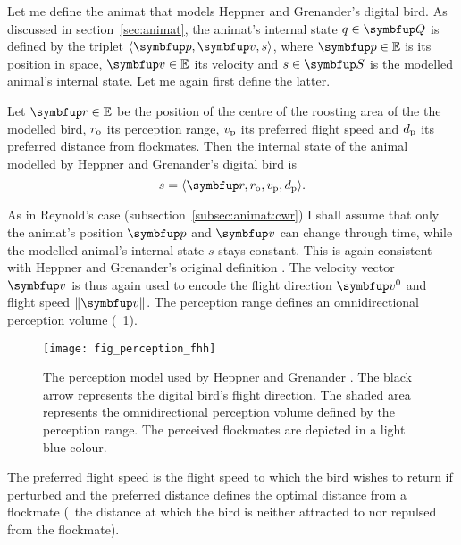Let me define the animat that models Heppner and Grenander's digital bird. As discussed in section~\ref{sec:animat}, the animat's internal state $q \in \set{Q}$ is defined by the triplet $\langle \vect{p}, \vect{v}, s \rangle$, where $\vect{p} \in \E$ is its position in space, $\vect{v} \in \E$ its velocity and $s \in \set{S}$ is the modelled animal's internal state. Let me again first define the latter.

\begin{definition}
  \label{def:animat:s:fhh}
  Let $\vect{r} \in \E$ be the position of the centre of the roosting area of the the modelled bird, $r_\textnormal{o}$ its perception range, $v_\textnormal{p}$ its preferred flight speed and $d_\textnormal{p}$ its preferred distance from flockmates. Then the internal state of the animal modelled by Heppner and Grenander's digital bird is
  \begin{equation}
    s=\langle \vect{r}, r_\textnormal{o}, v_\textnormal{p}, d_\textnormal{p} \rangle.
  \end{equation}
\end{definition}

As in Reynold's case (subsection~\ref{subsec:animat:cwr}) I shall assume that only the animat's position $\vect{p}$ and $\vect{v}$ can change through time, while the 	modelled animal's internal state $s$ stays constant. This is again consistent with Heppner and Grenander's original definition \cite{heppner:1990}. The velocity vector $\vect{v}$ is thus again used to encode the flight direction $\vect{v}^0$ and flight speed $\left\|\vect{v}\right\|$. The perception range defines an omnidirectional perception volume (\fig~\ref{fig:perception:fhh}).

\begin{figure}
  \texttt{[image: fig\_perception\_fhh]}
  \caption{The perception model used by Heppner and Grenander \cite{heppner:1990}. The black arrow represents the digital bird's flight direction. The shaded area represents the omnidirectional perception volume defined by the perception range. The perceived flockmates are depicted in a light blue colour.}
  \label{fig:perception:fhh}
\end{figure}

The preferred flight speed is the flight speed to which the bird wishes to return if perturbed and the preferred distance defines the optimal distance from a flockmate (\ie\ the distance at which the bird is neither attracted to nor repulsed from the flockmate).

